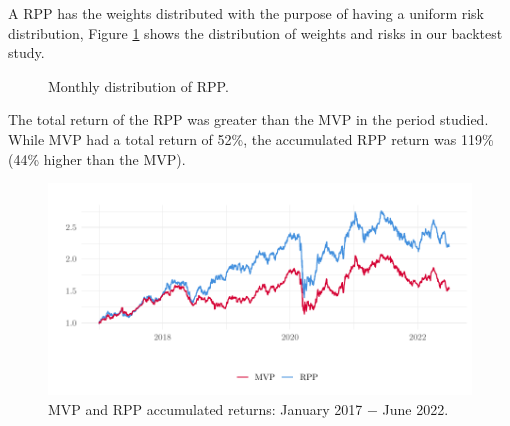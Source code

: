 A RPP has the weights distributed with the purpose of having a uniform risk distribution, Figure \ref{fig:totalRiskPPP} shows the distribution of weights and risks in our backtest study.

\begin{figure}[H]
	\begin{subfigmatrix}{2}
	\end{subfigmatrix}
	\caption{Monthly distribution of RPP.}
	\label{fig:totalRiskPPP}
\end{figure}

The total return of the RPP was greater than the MVP in the period studied. While MVP had a total return of 52\%, the accumulated RPP return was 119\% (44\% higher than the MVP).

\begin{figure}[H]
	\centering
	\includegraphics{figures/retornoRPPMVP.pdf}
	\caption{MVP and RPP accumulated returns: January 2017 $-$ June 2022.}
	\label{fig:retornoRPPMVP}
\end{figure}


